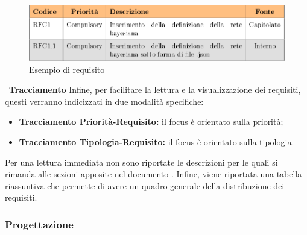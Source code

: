 	    \begin{figure}[!htbp]
	    	\centering
	    	\includegraphics[scale=0.45]{requisiti.png}
	    	\caption{Esempio di requisito}
	    \end{figure}
	    
	    ~\newline\textbf{Tracciamento} Infine, per facilitare la lettura e la visualizzazione dei requisiti, questi verranno indicizzati in due modalità specifiche:
	    \begin{itemize}
	    	\item \textbf{Tracciamento Priorità-Requisito:} il focus è orientato sulla priorità;
	    	\item \textbf{Tracciamento Tipologia-Requisito:} il focus è orientato sulla tipologia.\newline
	    \end{itemize}
	    Per una lettura immediata non sono riportate le descrizioni per le quali si rimanda alle sezioni apposite nel documento \AdR.
	    Infine, viene riportata una tabella riassuntiva che permette di avere un quadro generale della distribuzione dei requisiti.\newline

	    \subsubsection{Progettazione}
